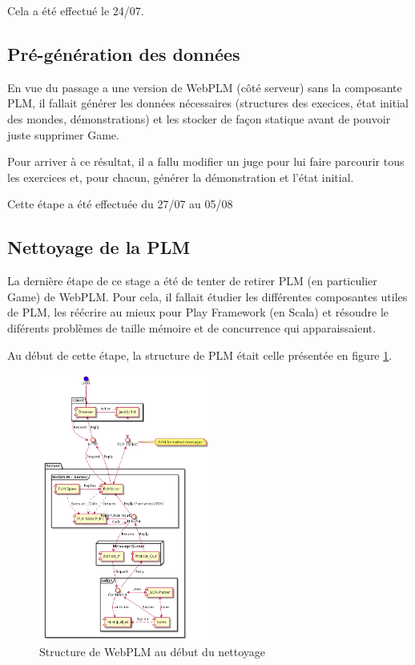 \documentclass[stage]{tnreport}
\begin{document}
Cela a été effectué le 24/07.

\subsection{Pré-génération des données}

En vue du passage a une version de WebPLM (côté serveur) sans la composante PLM, il fallait générer les données nécessaires (structures des execices, état initial des mondes, démonstrations) et les stocker de façon statique avant de pouvoir juste supprimer Game.

Pour arriver à ce résultat, il a fallu modifier un juge pour lui faire parcourir tous les exercices et, pour chacun, générer la démonstration et l'état initial.

Cette étape a été effectuée du 27/07 au 05/08

\subsection{Nettoyage de la PLM}

La dernière étape de ce stage a été de tenter de retirer PLM (en particulier Game) de WebPLM. Pour cela, il fallait étudier les différentes composantes utiles de PLM, les réécrire au mieux pour Play Framework (en Scala) et résoudre le diférents problèmes de taille mémoire et de concurrence qui apparaissaient.

Au début de cette étape, la structure de PLM était celle présentée en figure \ref{fig:wplmUP3}.
\begin{figure}[h!]
	\centering
		\includegraphics[width=0.5\textwidth]{figures/WebPLM-uml-cp3}
	\caption{Structure de WebPLM au début du nettoyage}
	\label{fig:wplmUP3}
\end{figure}
\end{document}
